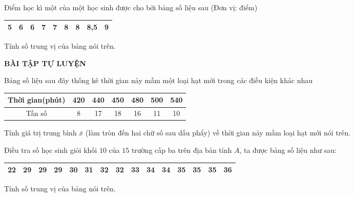 \begin{vd}%
Điểm học kì một của một học sinh được cho bởi  bảng số liệu sau (Đơn vị: điểm)
\begin{center}
\begin{tabular}{|c|c|c|c|c|c|c|c|c|}
\hline
  5& 6 &6&7& 7 &8 &8& 8,5&9\\
\hline
\end{tabular}
\end{center}
Tính số trung vị của bảng nói trên.
\end{vd}
\begin{center}
\textbf{BÀI TẬP TỰ LUYỆN}
\end{center}
\begin{bt}%
Bảng số liệu sau đây thống kê thời  gian nảy mầm một loại hạt mới trong các điều kiện khác nhau	
\begin{center}
\begin{tabular}{|c|c|c|c|c|c|c|}
\hline
Thời gian(phút) & 420 & 440 & 450 & 480  & 500 & 540   \\
\hline
Tần số&8& 17 & 18& 16 & 11 & 10    \\
\hline	
\end{tabular}
\end{center}
Tính giá trị trung bình $\bar{x}$ (làm tròn đến hai chữ số sau dấu phẩy) về thời gian nảy mầm loại hạt mới nói trên.
\end{bt}
\begin{bt}%
Điều tra  số học sinh giỏi khối $10$ của $15$ trường cấp ba trên địa bản tỉnh $A$, ta được bảng số liệu như sau:
\begin{center}
\begin{tabular}{|c|c|c|c|c|c|c|c|c|c|c|c|c|c|c|}
\hline
  22& 29 &29&29& 30 &31 &32& 32&33 &34 &34 &35 &35 &35 &36  \\
\hline	
\end{tabular}
\end{center}
Tính số trung vị của bảng nói trên.
\end{bt}

